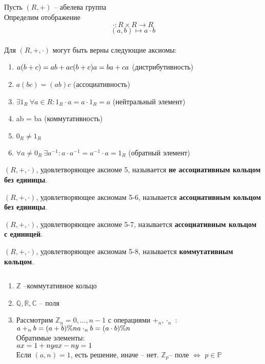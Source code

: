 \documentclass[12pt]{report}
\begin{document}
 Пусть $(R, +)$ -- абелева группа\\
Определим отображение
$$\cdot: R \times R \to R$$
$$  (a,b) \mapsto a \cdot b$$\\
Для $(R, +, \cdot)$ могут быть верны следующие аксиомы:
\begin{enumerate}
    \setcounter{enumi}{+4}
    \item $a(b+c) = ab + ac\\ 
	(b+c)a = ba + ca$ (дистрибутивность)
    \item $a(bc) = (ab)c$ (ассоциативность)
    \item $\exists 1_R \: \forall a \in R: 1_R \cdot a = a \cdot 1_R = a$ (нейтральный элемент)
    \item ab = ba (коммутативность)
    \item $0_R \ne 1_R$
    \item $\forall a \ne 0_R \: \exists a^{-1}: a \cdot a^{-1} = a^{-1} \cdot a = 1_R$ (обратный элемент)
\end{enumerate}

\begin{defn}
$(R, +, \cdot)$, удовлетворяющее аксиоме 5, называется {\bf не ассоциативным кольцом без единицы}.
\end{defn}

\begin{defn}
$(R, +, \cdot)$, удовлетворяющее аксиомам 5-6, называется {\bf ассоциативным кольцом без единицы}.
\end{defn}

\begin{defn}
$(R, +, \cdot)$, удовлетворяющее аксиоме 5-7, называется {\bf ассоциативным кольцом с единицей}.
\end{defn}

\begin{defn}
$(R, +, \cdot)$, удовлетворяющее аксиомам 5-8, называется {\bf коммутативным кольцом}.
\end{defn}

\begin{exs}$ $
\begin{enumerate}
    \item $\mathbb Z$ --коммутативное кольцо
    \item $\mathbb {Q, R, C}$ -- поля
    \item Рассмотрим $\mathbb Z_n = {0, \ldots, n-1}$ с операциями $+_n, \cdot_n$ :\\
	$a +_n b = (a + b) \% n \\
	a \cdot_n b = (a \cdot b) \% n$\\
	Обратимые элементы:\\
	$ax = 1 + ny \\
	ax - ny = 1$\\
	Если $(a, n) = 1$, есть решение, иначе -- нет.
	$\mathbb Z_p $-- поле $\Leftrightarrow$ $ p \in \mathbb P$
\end{enumerate}
\end{exs}
\end{document}
